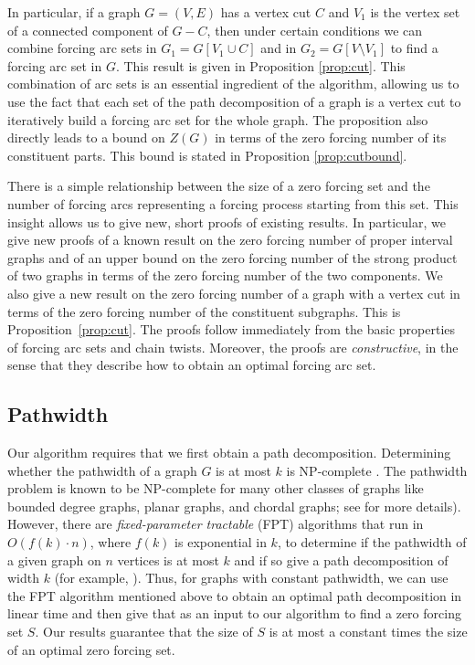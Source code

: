 \documentclass[12pt]{amsart}
\theoremstyle{plain}
\theoremstyle{definition}
\begin{document}
In particular, if a graph $G=(V,E)$ has a vertex cut $C$ and $V_1$ is the vertex set of a connected component of $G-C$, then under certain conditions we can combine forcing arc sets in $G_1=G[V_1\cup C]$ and in $G_2=G[V\setminus V_1]$ to find a forcing arc set in $G$. This result is given in Proposition \ref{prop:cut}. This combination of arc sets is an essential ingredient of the algorithm, allowing us to use the fact that each set of the path decomposition of a graph is a vertex cut to iteratively build a forcing arc set for the whole graph. The proposition also directly leads to a bound on $Z (G)$ in terms of the zero forcing number of its constituent parts. This bound is stated in Proposition \ref{prop:cutbound}.


There is a simple relationship between the size of a zero forcing set and the number of forcing arcs representing a forcing process starting from this set. This insight allows us to give new, short proofs of existing results. 
In particular, we give new proofs of a known result on the zero forcing number of proper interval graphs and of an upper bound on the zero forcing number of the strong product of two graphs in terms of the zero forcing number of the two components. We also give a new result on the zero forcing number of a graph with a vertex cut in terms of the zero forcing number of the constituent subgraphs. This is  Proposition~\ref{prop:cut}. The proofs follow immediately from the basic properties of forcing arc sets and chain twists. Moreover, the proofs are \emph{constructive}, in the sense that they describe how to obtain an optimal forcing arc set.

\subsection{Pathwidth}

Our algorithm requires that we first obtain a path decomposition. Determining whether the pathwidth of a graph $G$ is at most $k$ is NP-complete \cite{Arnborg}. The pathwidth problem is known to be NP-complete for many other classes of graphs like bounded degree graphs, planar graphs, and chordal graphs; see \cite{Bodlaender_tourist} for more details). However, there are {\em fixed-parameter tractable} (FPT) algorithms that run in $O(f(k)\cdot n)$, where $f(k)$ is exponential in $k$, 
to determine if the pathwidth of a given graph on $n$ vertices is at most $k$ and if so give a path decomposition of width $k$ (for example, \cite{BODLAENDER1}). Thus, for graphs with constant pathwidth, we can use the FPT algorithm mentioned above to obtain an optimal path decomposition in linear time and then give that as an input to our algorithm to find a zero forcing set $S$. Our results guarantee that the size of $S$ is at most a constant times the size of an optimal zero forcing set. 
\end{document}
